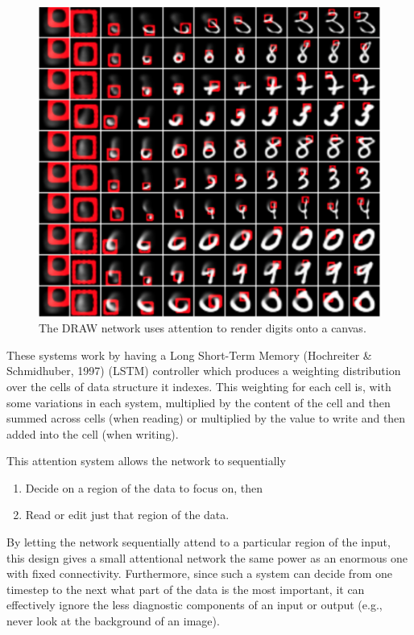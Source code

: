 \documentclass[]{article}
\providecommand{\tightlist}{%
  \setlength{\itemsep}{0pt}\setlength{\parskip}{0pt}}
\begin{document}
\begin{figure}[htbp]
\centering
\includegraphics{draw_attention_small.png}
\caption{\label{fig:draw}The DRAW network uses attention to render
digits onto a canvas.}
\end{figure}

These systems work by having a Long Short-Term Memory (Hochreiter \&
Schmidhuber, 1997) (LSTM) controller which produces a weighting
distribution over the cells of data structure it indexes. This weighting
for each cell is, with some variations in each system, multiplied by the
content of the cell and then summed across cells (when reading) or
multiplied by the value to write and then added into the cell (when
writing).

This attention system allows the network to sequentially

\begin{enumerate}
\def\labelenumi{\arabic{enumi}.}
\tightlist
\item
  Decide on a region of the data to focus on, then
\item
  Read or edit just that region of the data.
\end{enumerate}

By letting the network sequentially attend to a particular region of the
input, this design gives a small attentional network the same power as
an enormous one with fixed connectivity. Furthermore, since such a
system can decide from one timestep to the next what part of the data is
the most important, it can effectively ignore the less diagnostic
components of an input or output (e.g., never look at the background of
an image).
\end{document}
